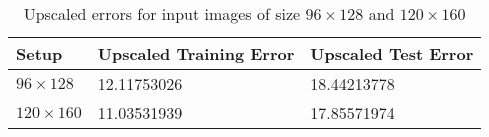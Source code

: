 \begin{table}[h!]
\centering
\footnotesize
\begin{tabular}{|l|l|l|}
	\hline
		\textbf{Setup} & \textbf{Upscaled Training Error} & \textbf{Upscaled Test Error}\\
	\hline
		$96\times128$	& 12.11753026
						& 18.44213778
						\\
	\hline
		$120\times160$ 	& 11.03531939
						& 17.85571974
						\\
	\hline
	\end{tabular}
	\normalsize
	\caption{Upscaled errors for input images of size $96\times128$ and $120\times160$}
	\label{tab:cnn_errors_400_96_vs_120}
\end{table}
